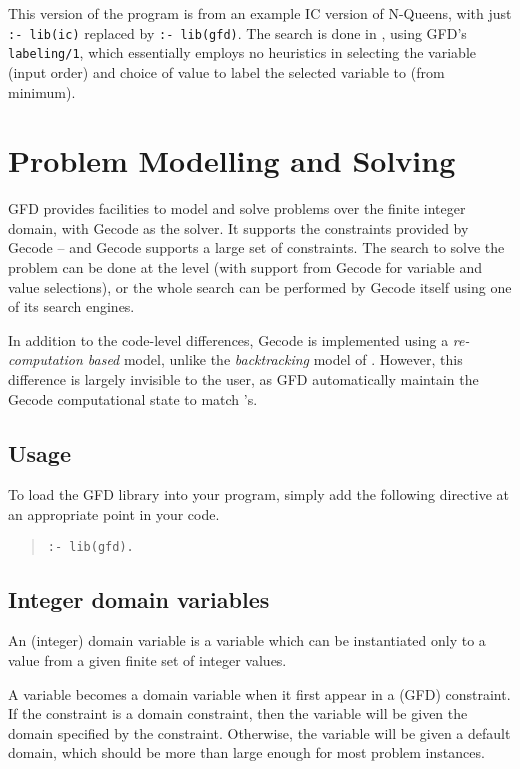 This version of the program is from an example IC version of N-Queens,
with just \verb':- lib(ic)' replaced by \verb':- lib(gfd)'. The
search is done in \eclipse, using GFD's \verb'labeling/1', which essentially
employs no heuristics in selecting the variable (input order) and choice of 
value to label the selected variable to (from minimum).



\section{Problem Modelling and Solving}

GFD provides facilities to model and solve problems over the 
finite integer domain, with Gecode as the solver. It supports the constraints
provided by Gecode -- and Gecode supports a large set of constraints. The 
search to solve the problem can be done at the 
\eclipse level (with support from Gecode for variable and value selections), 
or the whole search can be performed by Gecode itself using one of its 
search engines.   

In addition to the code-level differences, Gecode is implemented using a
{\it re-computation based\/} model, unlike the {\it backtracking\/}
 model of \eclipse. However, this difference is largely invisible to
the user, as GFD automatically maintain the Gecode computational state 
to match \eclipse's.

\subsection{Usage}

To load the GFD library into your program, simply add the following directive
at an appropriate point in your code.

\begin{quote}
\begin{verbatim}
:- lib(gfd).
\end{verbatim}
\end{quote}

\subsection{Integer domain variables}

An (integer) domain variable is a variable which can be instantiated only to a
value from a given finite set of integer values. 

A variable becomes a domain variable when it first appear in a (GFD) 
constraint. If the constraint is a domain constraint, then the variable will
be given the domain specified by the constraint. Otherwise, the variable will
be given a default domain, which should be more than large enough for
most problem instances. 

